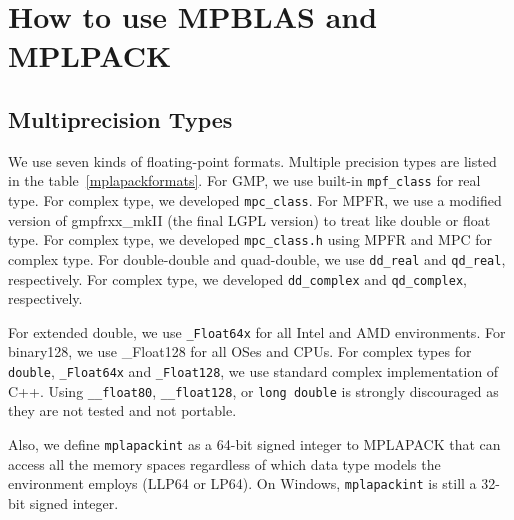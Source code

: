 \documentclass[12pt]{article}
\begin{document}

\section{How to use MPBLAS and MPLPACK}
\label{sec:howtouse}
\subsection{Multiprecision Types}
We use seven kinds of floating-point formats. Multiple precision types are listed in the table~\ref{mplapackformats}.
For GMP, we use built-in {\tt mpf\_class} for real type. For complex type, we developed {\tt mpc\_class}.
For MPFR, we use a modified version of gmpfrxx_mkII (the final LGPL version) to treat like double or float type. For complex type,
we developed {\tt mpc_class.h} using MPFR and MPC for complex type.
For double-double and quad-double, we use {\tt dd\_real} and {\tt qd\_real}, respectively. For complex type, we developed {\tt dd\_complex} and {\tt qd\_complex}, respectively.

For extended double, we use {\tt \_Float64x} for all Intel and AMD environments. For binary128, we use {\_Float128} for
all OSes and CPUs. For complex types for {\tt double}, {\tt \_Float64x} and {\tt \_Float128}, we use standard complex implementation of C++. Using {\tt \_\_float80}, {\tt \_\_float128}, or {\tt long double} is strongly discouraged as they are not tested and not portable.


Also, we define {\tt mplapackint} as a 64-bit signed integer to MPLAPACK that can access all the memory spaces regardless
of which data type models the environment employs (LLP64 or LP64). On Windows, {\tt mplapackint} is still a 32-bit signed integer.
\end{document}
